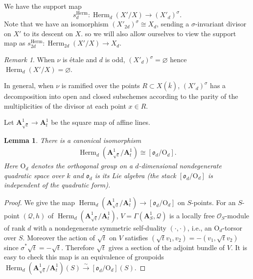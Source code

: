 \documentclass[reqno]{amsart}
\numberwithin{equation}{section}
\newcommand{\A}{\mathbf{A}}
\DeclareMathOperator{\Sp}{Sp}
\DeclareMathOperator{\Herm}{Herm}
\newcommand{\SH}{\textup{SkHm}}
\newcommand{\isom}{\stackrel{\sim}{\to}}
\newcommand{\ov}{\overline}
\newcommand\vn{\varnothing}
\renewcommand\sp{\mathfrak{sp}}
\newcommand\Og{\mathrm{O}}
\newcommand{\s}{\sigma}
\newcommand\cO{\mathcal{O}}
\newcommand\cQ{\mathcal{Q}}
\newcommand\fro{\mathfrak{o}}
\newtheorem{lemma}[thm]{Lemma}
\theoremstyle{remark}
\newtheorem{remark}[thm]{Remark}
\numberwithin{equation}{section}
\begin{document}
We have the support map
\begin{equation*}
s^{\Herm}_{d}: \Herm_{d}(X'/X)\to (X'_{d})^{\s}.
\end{equation*}
Note that we have an isomorphism $ (X'_{2d})^{\s} \cong X_d$, sending a $\sigma$-invariant divisor on $X'$ to its descent on $X$. so we will also allow ourselves to view the support map as $s^{\Herm}_{2d}: \Herm_{2d}(X'/X)\to X_d$. 

\begin{remark} When $\nu$ is \'etale and $d$ is odd, $(X'_{d})^{\s}=\vn$ hence $\Herm_{d}(X'/X)=\vn$. 

In general, when $\nu$ is ramified over the points $R\subset X(\ov k)$, $(X'_{d})^{\s}$ has a decomposition into open and closed subschemes according to the parity of the multiplicities of the divisor at each point $x\in R$.
\end{remark}

Let $\A^{1}_{\sqrt{t}}\to \A^{1}_{t}$ be the square map of affine lines.
\begin{lemma}\label{l:Herm A1} There is a canonical isomorphism
\begin{eqnarray*}
\Herm_{d}(\A^{1}_{\sqrt{t}}/\A^{1}_{t})\cong [\fro_{d}/\Og_{d}].
\end{eqnarray*}
Here $\Og_{d}$ denotes the orthogonal group on a $d$-dimensional nondegenerate quadratic space over $k$ and $\fro_{d}$ is its Lie algebra (the stack $[\fro_{d}/\Og_{d}]$ is independent of the quadratic form).
\end{lemma}
\begin{proof} We give the map $\Herm_{d}(\A^{1}_{\sqrt{t}}/\A^{1}_{t})\to [\fro_{d}/\Og_{d}]$ on $S$-points. For an $S$-point $(\cQ,h)$ of $\Herm_{d}(\A^{1}_{\sqrt{t}}/\A^{1}_{t})$, $V=\Gamma(\A^{1}_{S}, \cQ)$ is a locally free $\cO_{S}$-module of rank $d$ with a nondegenerate symmetric self-duality $(\cdot,\cdot)$, i.e., an $\Og_{d}$-torsor over $S$. Moreover the action of $\sqrt{t}$ on $V$ satisfies $(\sqrt{t}v_{1},v_{2})=-(v_{1},\sqrt{t}v_{2})$ since $\s^{*}\sqrt{t}=-\sqrt{t}$. Therefore $\sqrt{t}$ gives a section of the adjoint bundle of $V$. It is easy to check this map is an equivalence of groupoids $\Herm_{d}(\A^{1}_{\sqrt{t}}/\A^{1}_{t})(S)\isom [\fro_{d}/\Og_{d}](S)$.  
\end{proof}
\end{document}
